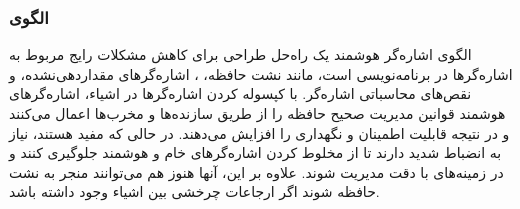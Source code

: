 \subsubsection{الگوی }
\label{memSmartPointerSec}
\begin{RTL}
الگوی اشاره‌گر هوشمند یک راه‌حل طراحی برای کاهش مشکلات رایج مربوط به اشاره‌گرها
در برنامه‌نویسی است، مانند نشت حافظه،
، اشاره‌گرهای مقداردهی‌نشده،
و نقص‌های محاسباتی اشاره‌گر.
با کپسوله کردن اشاره‌گرها در اشیاء، اشاره‌گرهای هوشمند قوانین مدیریت
صحیح حافظه را از طریق سازنده‌ها و مخرب‌ها اعمال می‌کنند
و در نتیجه قابلیت اطمینان و نگهداری را افزایش می‌دهند.
در حالی که مفید هستند، نیاز به انضباط شدید دارند تا از مخلوط کردن
اشاره‌گرهای خام و هوشمند جلوگیری کنند و در زمینه‌های 
با دقت مدیریت شوند.
علاوه بر این، آنها هنوز هم می‌توانند منجر به نشت حافظه شوند اگر ارجاعات
چرخشی بین اشیاء وجود داشته باشد.
\end{RTL}
